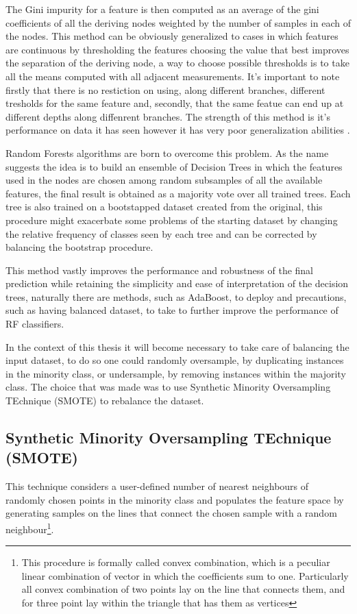 The Gini impurity for a feature is then computed as an average of the gini coefficients of all the deriving nodes weighted by the number of samples in each of the nodes.  This method can be obviously generalized to cases in which features are continuous by thresholding the features choosing the value that best improves the separation of the deriving node, a way to choose possible thresholds is to take all the means computed with all adjacent measurements. It's important to note firstly that there is no restiction on using, along different branches, different tresholds for the same feature and, secondly, that the same featue can end up at different depths along diffenrent branches. The strength of this method is it's performance on data it has seen however it has very poor generalization abilities \cite{StatisticalLearning}. 

Random Forests algorithms are born to overcome this problem. As the name suggests the idea is to build an ensemble of Decision Trees in which the features used in the nodes are chosen among random subsamples of all the available features, the final result is obtained as a majority vote over all trained trees. Each tree is also trained on a bootstapped dataset created from the original, this procedure might exacerbate some problems of the starting dataset by changing the relative frequency of classes seen by each tree and can be corrected by balancing the bootstrap procedure.

This method vastly improves the performance and robustness of the final prediction while retaining the simplicity and ease of interpretation of the decision trees, naturally there are methods, such as AdaBoost, to deploy and precautions, such as having balanced dataset, to take to further improve the performance of RF classifiers.

In the context of this thesis it will become necessary to take care of balancing the input dataset, to do so one could randomly oversample, by duplicating instances in the minority class, or undersample, by removing instances within the majority class. The choice that was made was to use Synthetic Minority Oversampling TEchnique (SMOTE)\cite{SMOTE} to rebalance the dataset.

\subsection{Synthetic Minority Oversampling TEchnique (SMOTE)}
This technique considers a user-defined number of nearest neighbours of randomly chosen points in the minority class and populates the feature space by generating samples on the lines that connect the chosen sample with a random neighbour\footnote{This procedure is formally called convex combination, which is a peculiar linear combination of vector in which the coefficients sum to one. Particularly all convex combination of two points lay on the line that connects them, and for three point lay within the triangle that has them as vertices}.


